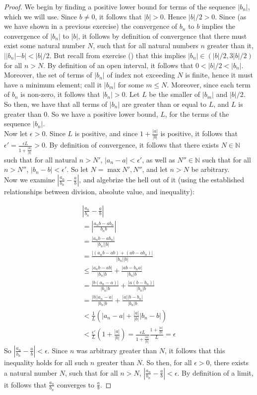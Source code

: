 \documentclass[11pt]{article}
\newcommand{\N}{\mathbb{N}}
\theoremstyle{definition}
\begin{document}
\begin{proof}
We begin by finding a positive lower bound for terms of the sequence $|b_n|$, which we will use. Since $b \ne 0$, it follows that $|b|> 0$. Hence $|b|/2 > 0$. Since (as we have shown in a previous exercise) the convergence of $b_n$ to $b$ implies the convergence of $|b_n|$ to $|b|$, it follows by definition of convergence that there must exist some natural number $N$, such that for all natural numbers $n$ greater than it, $||b_n| - b| < |b|/2$. But recall from exercise () that this implies $|b_n| \in (|b|/2, 3|b|/2)$ for all $n > N$. By definition of an open interval, it follows that $ 0<|b|/2 < |b_n|$. Moreover, the set of terms of $|b_n|$ of index not exceeding $N$ is finite, hence it must have a minimum element; call it $|b_m|$ for some $m \le N$. Moreover, since each term of $b_n$ is non-zero, it follows that $|b_n| > 0$. Let $L$ be the smaller of $|b_m|$ and $|b|/2$. So then, we have that all terms of $ |b_n|$ are greater than or equal to $L$, and $L$ is greater than $0$. So we have a positive lower bound, $L$, for the terms of the sequence $|b_n|$.\\

Now let $\epsilon >0$. Since $L$ is positive, and since $1 + \frac{|a|}{|b|}$ is positive, it follows that $\epsilon' =\frac{\epsilon L}{1 + \frac{|a|}{|b|}} > 0$. By definition of convergence, it follows that there exists $N\in \N$ such that for all natural $n> N'$, $|a_n - a| < \epsilon'$, as well as $N''\in \N$ such that for all $n>N''$, $|b_n - b| < \epsilon '$. So let $N = \max{N',N''}$, and let $n > N$ be arbitrary.\\

Now we examine $|\frac{a_n}{b_n} - \frac{a}{b}|$, and algebrize the hell out of it (using the established relationships between division, absolute value, and inequality):

\[
\begin{array}{c}
|\frac{a_n}{b_n} - \frac{a}{b}| \\
= |\frac{a_n b - ab_n}{b_n b}|\\
= \frac{|a_n b - ab_n|}{|b_n||b|}\\
= \frac{|(a_n b - ab) + (ab - ab_n)|}{|b_n||b|} \\
\le \frac{|a_nb - ab|}{|b_n|b} + \frac{|ab - b_na|}{|b_n|b}\\
 = \frac{|b(a_n - a)|}{|b_n|b} + \frac{|a(b - b_n)|}{|b_n|b}\\
 = \frac{|b||a_n - a|}{|b_n|b} + \frac{|a||b - b_n|}{|b_n|b}\\
 < \frac{1}{L}(|a_n - a| + \frac{|a|}{|b|}|b_n - b|)\\
 < \frac{\epsilon'}{L}(1 + \frac{|a|}{|b|}) = \frac{\epsilon L}{1 + \frac{|a|}{|b|}}\frac{1 + \frac{|a|}{|b|}}{L}  = \epsilon
 
\end{array}
\]
So $|\frac{a_n}{b_n} - \frac{a}{b}| < \epsilon$. Since $n$ was arbitrary greater than $N$, it follows that this inequality holds for all such $n$ greater than $N$. So then, for all $\epsilon > 0$, there exists a natural number $N$, such that for all $n> N$, $|\frac{a_n}{b_n} - \frac{a}{b}| < \epsilon$. By definition of a limit, it follows that $\frac{a_n}{b_n}$ converges to $\frac{a}{b}$. 
\end{proof}
\end{document}
